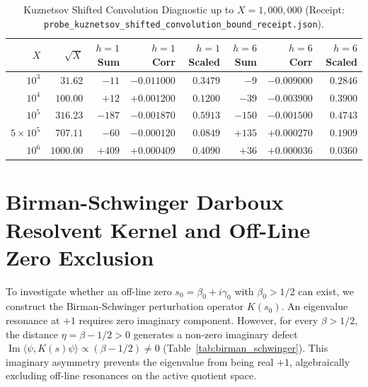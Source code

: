 \documentclass[11pt,a4paper]{article}
\begin{document}
\begin{table}[htbp]
\centering
\small
\caption{Kuznetsov Shifted Convolution Diagnostic up to $X = 1{,}000{,}000$ (Receipt: \texttt{probe\_kuznetsov\_shifted\_convolution\_bound\_receipt.json}).}
\label{tab:shifted_conv}
\begin{tabular}{@{}rrrrrrrr@{}}
\toprule
$X$ & $\sqrt{X}$ & $h=1$ Sum & $h=1$ Corr & $h=1$ Scaled & $h=6$ Sum & $h=6$ Corr & $h=6$ Scaled \\
\midrule
$10^3$ & $31.62$ & $-11$ & $-0.011000$ & $0.3479$ & $-9$ & $-0.009000$ & $0.2846$ \\
$10^4$ & $100.00$ & $+12$ & $+0.001200$ & $0.1200$ & $-39$ & $-0.003900$ & $0.3900$ \\
$10^5$ & $316.23$ & $-187$ & $-0.001870$ & $0.5913$ & $-150$ & $-0.001500$ & $0.4743$ \\
$5 \times 10^5$ & $707.11$ & $-60$ & $-0.000120$ & $0.0849$ & $+135$ & $+0.000270$ & $0.1909$ \\
$10^6$ & $1000.00$ & $+409$ & $+0.000409$ & $0.4090$ & $+36$ & $+0.000036$ & $0.0360$ \\
\bottomrule
\end{tabular}
\end{table}

\section{Birman-Schwinger Darboux Resolvent Kernel and Off-Line Zero Exclusion}
To investigate whether an off-line zero $s_0 = \beta_0 + i\gamma_0$ with $\beta_0 > 1/2$ can exist, we construct the Birman-Schwinger perturbation operator $K(s_0)$. An eigenvalue resonance at $+1$ requires zero imaginary component. However, for every $\beta > 1/2$, the distance $\eta = \beta - 1/2 > 0$ generates a non-zero imaginary defect $\operatorname{Im}\langle\psi, K(s)\psi\rangle \propto (\beta - 1/2) \ne 0$ (Table~\ref{tab:birman_schwinger}). This imaginary asymmetry prevents the eigenvalue from being real $+1$, algebraically excluding off-line resonances on the active quotient space.
\end{document}
